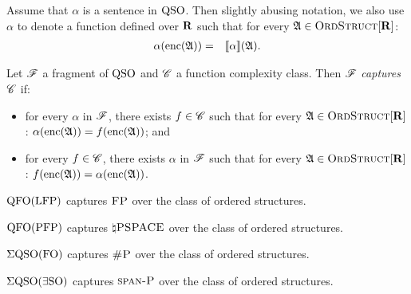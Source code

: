 

Assume that $\alpha$ is a sentence in ${\rm QSO}$. Then slightly abusing notation, we also use $\alpha$ to denote a function defined over $\mathbf{R}$  such that for every $\mathfrak{A} \in \text{\sc OrdStruct}[\mathbf{R}] $:
\begin{eqnarray*}
	\alpha({\rm enc}(\mathfrak{A})) & = & {\llbracket{}{\alpha}\rrbracket}(\mathfrak{A}).
\end{eqnarray*}
\begin{definition}
	Let $\mathscr{F}$ a fragment of ${\rm QSO}$ and $\mathscr{C}$ a function complexity class. Then $\mathscr{F}$ {\em captures} $\mathscr{C}$ if:
	\begin{itemize}
		\item for every $\alpha$ in $\mathscr{F}$, there exists $f \in \mathscr{C}$ such that for every 
		$\mathfrak{A} \in \text{\sc OrdStruct}[\mathbf{R}]$:  $\alpha({\rm enc}(\mathfrak{A})) = f({\rm enc}(\mathfrak{A}))$; and
		
		\item for every $f \in \mathscr{C}$, there exists $\alpha$ in $\mathscr{F}$ such that for every 
		$\mathfrak{A} \in \text{\sc OrdStruct}[\mathbf{R}]$:  $f({\rm enc}(\mathfrak{A})) = \alpha({\rm enc}(\mathfrak{A}))$.
	\end{itemize}
\end{definition}

\begin{theorem} \label{captfp}
	${\rm QFO}({\rm LFP})$ captures $\text{\sc FP}$ over the class of ordered structures.
\end{theorem}

\begin{theorem} \label{qfo-pfp-cap}
	${\rm QFO}({\rm PFP})$ captures $\natural\text{\sc PSPACE}$ over the class of ordered structures.
\end{theorem}

\begin{theorem} \label{eqso-fo-cap}
	$\Sigma{\rm QSO}({\rm FO})$ captures $\text{\sc \#P}$ over the class of ordered structures.
\end{theorem}

\begin{theorem} \label{eqso-eso-cap}
	$\Sigma{\rm QSO}(\exists{\rm SO})$ captures $\text{\sc span-P}$ over the class of ordered structures.
\end{theorem}
